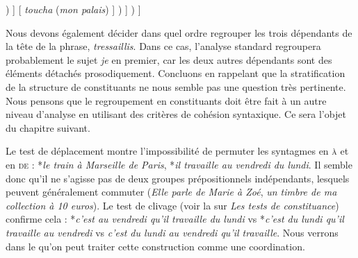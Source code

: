 {    \begin{exe}
    \relax
        [ \textit{à} ( \textit{l’} [ (\textit{instant même}) ( \textit{où} [ \textit{la} (\textit{gorgée} [\textit{mêlée des miettes du gâteau}] ) ] [ \textit{toucha} (\textit{mon palais}) ] ) ] ) ]
    \end{exe}
    Nous devons également décider dans quel ordre regrouper les trois dépendants de la tête de la phrase, \textit{tressaillis}. Dans ce cas, l’analyse standard regroupera probablement le sujet \textit{je} en premier, car les deux autres dépendants sont des éléments détachés prosodiquement. Concluons en rappelant que la stratification de la structure de constituants ne nous semble pas une question très pertinente. Nous pensons que le regroupement en constituants doit être fait à un autre niveau d’analyse en utilisant des critères de cohésion syntaxique. Ce sera l’objet du chapitre suivant.
 
  Le test de déplacement montre l’impossibilité de permuter les syntagmes en \textsc{à} et en \textsc{de} : *\textit{le train à Marseille de Paris}, *\textit{il travaille au vendredi du lundi}. Il semble donc qu’il ne s’agisse pas de deux groupes prépositionnels indépendants, lesquels peuvent généralement commuter (\textit{Elle parle de Marie à Zoé}, \textit{un timbre de ma collection à 10 euros}). Le test de clivage (voir la  sur \textit{Les tests de constituance}) confirme cela : *\textit{c’est au vendredi qu’il travaille du lundi} vs *\textit{c’est du lundi qu’il travaille au vendredi} vs \textit{c’est du lundi au vendredi qu’il travaille}. Nous verrons dans le  qu’on peut traiter cette construction comme une coordination.
}
